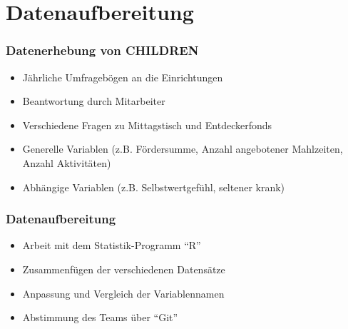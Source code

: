 \section{Datenaufbereitung}

\begin{frame}[fragile]
\frametitle{Datenerhebung von CHILDREN}
\begin{itemize}
 \item<1-> Jährliche Umfragebögen an die Einrichtungen
 \item<2-> Beantwortung durch Mitarbeiter
 \item<3-> Verschiedene Fragen zu Mittagstisch und Entdeckerfonds
 \item<4-> Generelle Variablen (z.B. Fördersumme, Anzahl angebotener Mahlzeiten, Anzahl Aktivitäten)
 \item<5-> Abhängige Variablen (z.B. Selbstwertgefühl, seltener krank)
\end{itemize}
\end{frame}

\begin{frame}[fragile]
\frametitle{Datenaufbereitung}
\begin{itemize}
 \item<1-> Arbeit mit dem Statistik-Programm “R”
 \item<2-> Zusammenfügen der verschiedenen Datensätze
 \item<3-> Anpassung und Vergleich der Variablennamen
 \item<4-> Abstimmung des Teams über “Git”
\end{itemize}
\end{frame}

